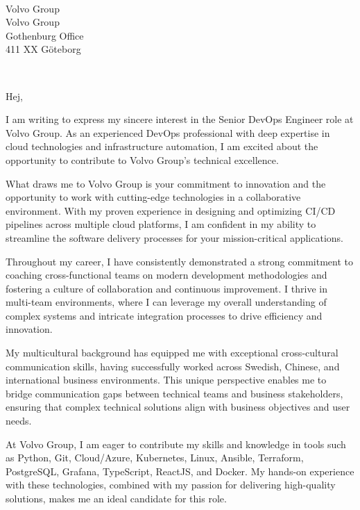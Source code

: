 \documentclass[a4paper,10pt]{article}
\begin{document}
\pagestyle{empty} %

\begin{letter}{\color{darkblue}\\
Volvo Group\\
Volvo Group\\Gothenburg Office\\
411 XX Göteborg}

\\
\vspace{40pt}

\opening{Hej,}

\vspace{10pt}

I am writing to express my sincere interest in the Senior DevOps Engineer role at Volvo Group. As an experienced DevOps professional with deep expertise in cloud technologies and infrastructure automation, I am excited about the opportunity to contribute to Volvo Group's technical excellence.

What draws me to Volvo Group is your commitment to innovation and the opportunity to work with cutting-edge technologies in a collaborative environment. With my proven experience in designing and optimizing CI/CD pipelines across multiple cloud platforms, I am confident in my ability to streamline the software delivery processes for your mission-critical applications.

Throughout my career, I have consistently demonstrated a strong commitment to coaching cross-functional teams on modern development methodologies and fostering a culture of collaboration and continuous improvement. I thrive in multi-team environments, where I can leverage my overall understanding of complex systems and intricate integration processes to drive efficiency and innovation.
        
My multicultural background has equipped me with exceptional cross-cultural communication skills, having successfully worked across Swedish, Chinese, and international business environments. This unique perspective enables me to bridge communication gaps between technical teams and business stakeholders, ensuring that complex technical solutions align with business objectives and user needs.

At Volvo Group, I am eager to contribute my skills and knowledge in tools such as Python, Git, Cloud/Azure, Kubernetes, Linux, Ansible, Terraform, PostgreSQL, Grafana, TypeScript, ReactJS, and Docker. My hands-on experience with these technologies, combined with my passion for delivering high-quality solutions, makes me an ideal candidate for this role.


\end{letter}
\end{document}

